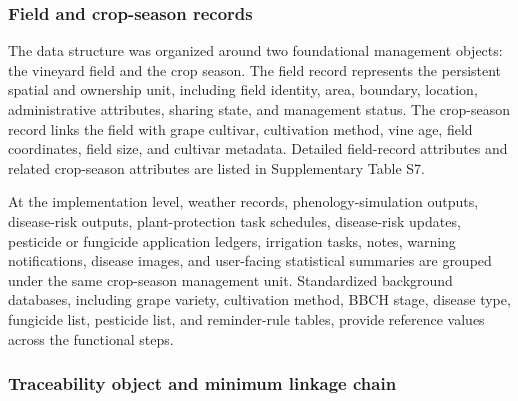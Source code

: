 \documentclass[12pt]{article}
\begin{document}
\subsubsection{Field and crop-season records}\label{field-and-crop-season-records}

The data structure was organized around two foundational management objects: the vineyard field and the crop season. The field record represents the persistent spatial and ownership unit, including field identity, area, boundary, location, administrative attributes, sharing state, and management status. The crop-season record links the field with grape cultivar, cultivation method, vine age, field coordinates, field size, and cultivar metadata. Detailed field-record attributes and related crop-season attributes are listed in Supplementary Table S7.

At the implementation level, weather records, phenology-simulation outputs, disease-risk outputs, plant-protection task schedules, disease-risk updates, pesticide or fungicide application ledgers, irrigation tasks, notes, warning notifications, disease images, and user-facing statistical summaries are grouped under the same crop-season management unit. Standardized background databases, including grape variety, cultivation method, BBCH stage, disease type, fungicide list, pesticide list, and reminder-rule tables, provide reference values across the functional steps.

\subsubsection{Traceability object and minimum linkage chain}\label{traceability-object-and-minimum-linkage-chain}
\end{document}
